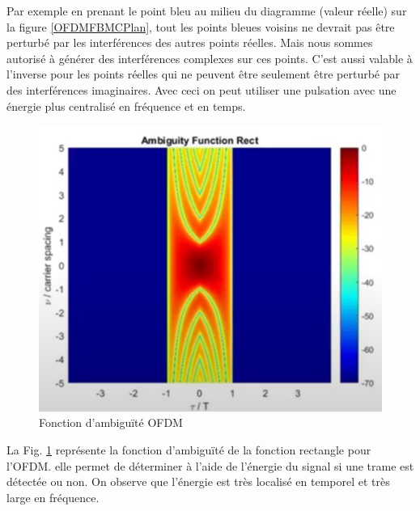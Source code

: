 \documentclass[conference]{IEEEtran}
\begin{document}
Par exemple en prenant le point bleu au milieu du diagramme (valeur réelle) sur la figure \ref{OFDMFBMCPlan}, tout les points bleues voisins ne devrait pas être perturbé par les interférences des autres points réelles. Mais nous sommes autorisé à générer des interférences complexes sur ces points. C’est aussi valable à l’inverse pour les points réelles qui ne peuvent être seulement être perturbé par des interférences imaginaires.
Avec ceci on peut utiliser une pulsation avec une énergie plus centralisé en fréquence et en temps. 

\begin{figure}[htbp]
\centerline{\includegraphics{AmbuigOFDM.png}}
\caption{Fonction d'ambiguïté OFDM}
\label{AmbOFDM}
\end{figure}

La Fig. \ref{AmbOFDM} représente la fonction d'ambiguïté de la fonction rectangle pour l'OFDM. elle permet de déterminer à l'aide de l'énergie du signal si une trame est détectée ou non.
On observe que l'énergie est très localisé en temporel et très large en fréquence.
\end{document}
